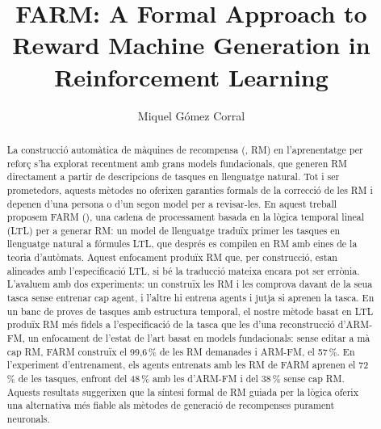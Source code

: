 \documentclass[11pt,english,listoffigures,listoftables]{tfgetsinf}
\title{FARM: A Formal Approach to Reward Machine Generation in Reinforcement Learning}
\author{Miquel Gómez Corral}
\begin{document}

\begin{abstract}
La construcció automàtica de màquines de recompensa (, RM) en l'aprenentatge per reforç s'ha explorat recentment amb grans models fundacionals, que generen RM directament a partir de descripcions de tasques en llenguatge natural. Tot i ser prometedors, aquests mètodes no oferixen garanties formals de la correcció de les RM i depenen d'una persona o d'un segon model per a revisar-les. En aquest treball proposem FARM (), una cadena de processament basada en la lògica temporal lineal (LTL) per a generar RM: un model de llenguatge traduïx primer les tasques en llenguatge natural a fórmules LTL, que després es compilen en RM amb eines de la teoria d'autòmats. Aquest enfocament produïx RM que, per construcció, estan alineades amb l'especificació LTL, si bé la traducció mateixa encara pot ser errònia. L'avaluem amb dos experiments: un construïx les RM i les comprova davant de la seua tasca sense entrenar cap agent, i l'altre hi entrena agents i jutja si aprenen la tasca. En un banc de proves de tasques amb estructura temporal, el nostre mètode basat en LTL produïx RM més fidels a l'especificació de la tasca que les d'una reconstrucció d'ARM-FM, un enfocament de l'estat de l'art basat en models fundacionals: sense editar a mà cap RM, FARM construïx el 99,6\,\% de les RM demanades i ARM-FM, el 57\,\%. En l'experiment d'entrenament, els agents entrenats amb les RM de FARM aprenen el 72\,\% de les tasques, enfront del 48\,\% amb les d'ARM-FM i del 38\,\% sense cap RM. Aquests resultats suggerixen que la síntesi formal de RM guiada per la lògica oferix una alternativa més fiable als mètodes de generació de recompenses purament neuronals.
\end{abstract}
\end{document}
